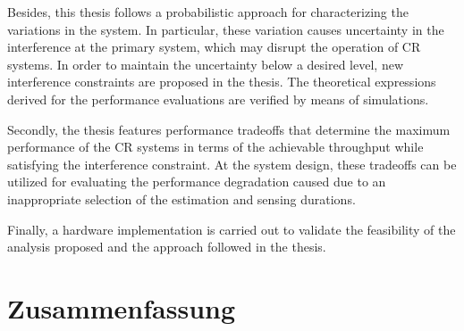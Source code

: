 Besides, this thesis follows a probabilistic approach for characterizing the variations in the system. In particular, these variation causes uncertainty in the interference at the primary system, which may disrupt the operation of CR systems. In order to maintain the uncertainty below a desired level, new interference constraints are proposed in the thesis. The theoretical expressions derived for the performance evaluations are verified by means of simulations. 




Secondly, the thesis features performance tradeoffs that determine the maximum performance of the CR systems in terms of the achievable throughput while satisfying the interference constraint. At the system design, these tradeoffs can be utilized for evaluating the performance degradation caused due to an inappropriate selection of the estimation and sensing durations. 

Finally, a hardware implementation is carried out to validate the feasibility of the analysis proposed and the approach followed in the thesis.  


\cleardoublepage
\chapter*{Zusammenfassung}


\cleardoublepage

